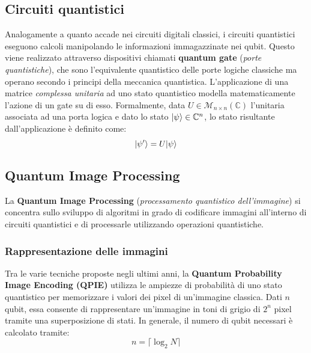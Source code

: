 
\subsection{Circuiti quantistici}

Analogamente a quanto accade nei circuiti digitali classici, i circuiti
quantistici eseguono calcoli manipolando le informazioni immagazzinate nei
qubit. Questo viene realizzato attraverso dispositivi chiamati \textbf{quantum
gate} (\emph{porte quantistiche}), che sono l'equivalente quantistico delle porte logiche classiche
ma operano secondo i principi della meccanica quantistica. L'applicazione di una
matrice \emph{complessa unitaria} ad uno stato quantistico modella matematicamente l'azione di un
gate su di esso. Formalmente, data $U \in \mathcal{M}_{n \times n}(\mathbb{C})$
l'unitaria associata ad una porta logica e dato lo stato $\lvert\psi\rangle \in
\mathbb{C}^n$, lo stato risultante dall'applicazione è definito come:
\begin{equation}
	\lvert\psi'\rangle = U\lvert\psi\rangle
	\label{eq:gate-res-state}
\end{equation}

\subsection{Quantum Image Processing}

La \textbf{Quantum Image Processing} (\emph{processamento quantistico
dell'immagine}) si concentra sullo sviluppo di algoritmi in grado di codificare immagini all’interno di circuiti quantistici e di processarle utilizzando operazioni quantistiche. 

\subsubsection*{Rappresentazione delle immagini} Tra le varie tecniche proposte negli
ultimi anni, la \textbf{Quantum Probability Image Encoding (QPIE)} \cite{qpie} utilizza le ampiezze di probabilità di uno stato quantistico per memorizzare i valori dei pixel di un'immagine classica. Dati $n$ qubit, essa consente di rappresentare un'immagine in toni di grigio di $2^n$ pixel tramite una superposizione di stati. In generale, il numero di qubit necessari è calcolato tramite:
\begin{equation}
	n = \lceil{\log_2{N}}\rceil
	\label{eq:qpie-n-qubit}
\end{equation}

